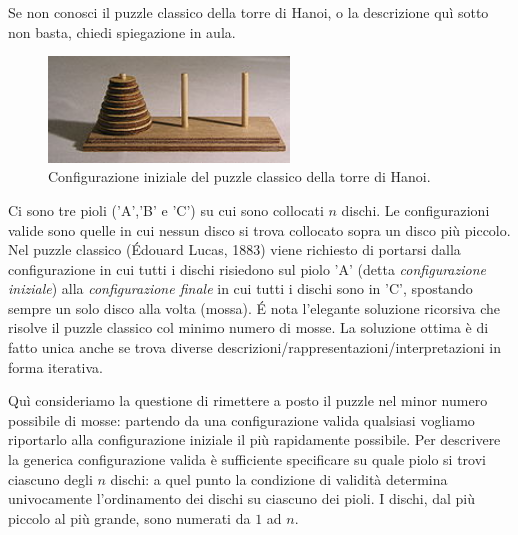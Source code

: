 \renewcommand{\nomebreve}{hanoi\_puzzle\_reset}
\renewcommand{\titolo}{Revert the Hanoi puzzle back to its initial configuration}

\introduzione{}

Se non conosci il puzzle classico della torre di Hanoi, o la descrizione quì sotto non basta, chiedi spiegazione in aula.

\begin{figure}[h!]
\begin{center}
  \noindent \includegraphics[width=0.57\textwidth]{figures/220px-Tower_of_Hanoi.jpeg}
\end{center}
\caption{Configurazione iniziale del puzzle classico della torre di Hanoi.}
\end{figure}

Ci sono tre pioli ('A','B' e 'C') su cui sono collocati $n$ dischi. Le configurazioni valide sono quelle in cui nessun disco si trova collocato sopra un disco più piccolo.
Nel puzzle classico (Édouard Lucas, 1883) viene richiesto di portarsi dalla configurazione in cui tutti i dischi risiedono sul piolo 'A' (detta \emph{configurazione iniziale}) alla \emph{configurazione finale} in cui tutti i dischi sono in 'C', spostando sempre un solo disco alla volta (mossa).
\'E nota l'elegante soluzione ricorsiva che risolve il puzzle classico col minimo numero di mosse. La soluzione ottima è di fatto unica anche se trova diverse descrizioni/rappresentazioni/interpretazioni in forma iterativa.

\begin{center}
\end{center}

Quì consideriamo la questione di rimettere a posto il puzzle nel minor numero possibile di mosse: partendo da una configurazione valida qualsiasi vogliamo riportarlo alla configurazione iniziale il più rapidamente possibile.
Per descrivere la generica configurazione valida è sufficiente specificare su quale piolo si trovi ciascuno degli $n$ dischi:
a quel punto la condizione di validità determina univocamente l'ordinamento dei dischi su ciascuno dei pioli. I dischi, dal più piccolo al più grande, sono numerati da $1$ ad $n$.

